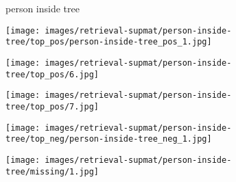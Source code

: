 \documentclass[10pt,twocolumn,letterpaper]{article}
\begin{document}
\begin{figure*}[t]
   
\begin{minipage}[b]{0.005\textwidth}
    	\centering
    	\begin{turn}{90}
    \small{{\color{blue}person} inside {\color{red}tree}}
    	\end{turn}	
    \vspace{-1.5ex}
    \end{minipage}
    \hspace{0.01\textwidth}
\begin{minipage}[t]{0.18\textwidth}
    	\centering
    		\texttt{[image: images/retrieval-supmat/person-inside-tree/top\_pos/person-inside-tree\_pos\_1.jpg]}\\
\vspace{1.5ex}
    \end{minipage}
    \hspace{0.005\textwidth}  
\begin{minipage}[t]{0.18\textwidth}
    	\centering
       	\texttt{[image: images/retrieval-supmat/person-inside-tree/top\_pos/6.jpg]}\\
       	\vspace{1.5ex}
    \end{minipage}
    \hspace{0.005\textwidth}
\begin{minipage}[t]{0.18\textwidth}
       \centering
       \texttt{[image: images/retrieval-supmat/person-inside-tree/top\_pos/7.jpg]}\\
       \vspace{1.5ex}
    \end{minipage}
    \hspace{0.005\textwidth}
\begin{minipage}[t]{0.18\textwidth}
    	\centering
       	\texttt{[image: images/retrieval-supmat/person-inside-tree/top\_neg/person-inside-tree\_neg\_1.jpg]}\\
      	\vspace{1.5ex}
    \end{minipage} 
    \hspace{0.005\textwidth}
\begin{minipage}[t]{0.18\textwidth}
    	\centering
       	\texttt{[image: images/retrieval-supmat/person-inside-tree/missing/1.jpg]}\\
       	\vspace{1.5ex}
    \end{minipage}
       

\end{figure*}
\end{document}
